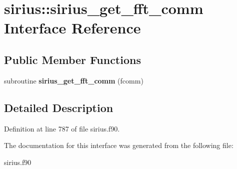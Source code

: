 \hypertarget{interfacesirius_1_1sirius__get__fft__comm}{}\section{sirius\+:\+:sirius\+\_\+get\+\_\+fft\+\_\+comm Interface Reference}
\label{interfacesirius_1_1sirius__get__fft__comm}
\subsection*{Public Member Functions}
\begin{DoxyCompactItemize}
\item 
\hypertarget{interfacesirius_1_1sirius__get__fft__comm_ad9386fa22f82794a7b36fa558eb07288}{}subroutine {\bfseries sirius\+\_\+get\+\_\+fft\+\_\+comm} (fcomm)\label{interfacesirius_1_1sirius__get__fft__comm_ad9386fa22f82794a7b36fa558eb07288}

\end{DoxyCompactItemize}


\subsection{Detailed Description}


Definition at line 787 of file sirius.\+f90.



The documentation for this interface was generated from the following file\+:\begin{DoxyCompactItemize}
\item 
sirius.\+f90\end{DoxyCompactItemize}
